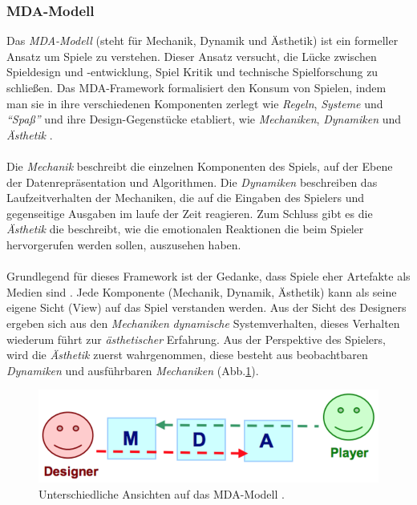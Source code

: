 \documentclass[a4paper,12pt]{scrartcl}
\begin{document}
\subsubsection{MDA-Modell}
Das \textit{MDA-Modell} (steht für Mechanik, Dynamik und Ästhetik) ist ein formeller Ansatz um Spiele zu verstehen. Dieser Ansatz versucht, die Lücke zwischen Spieldesign und -entwicklung, Spiel Kritik und technische Spielforschung zu schließen. Das MDA-Framework formalisiert den Konsum von Spielen, indem man sie in ihre verschiedenen Komponenten zerlegt wie \textit{Regeln}, \textit{Systeme} und \textit{\enquote{Spaß}} und ihre Design-Gegenstücke etabliert, wie \textit{Mechaniken}, \textit{Dynamiken} und \textit{Ästhetik} \cite{Hunicke2004}.
\\\\
Die \textit{Mechanik} beschreibt die einzelnen Komponenten des Spiels, auf der Ebene der Datenrepräsentation und Algorithmen. Die \textit{Dynamiken} beschreiben das Laufzeitverhalten der Mechaniken, die auf die Eingaben des Spielers und gegenseitige Ausgaben im laufe der Zeit reagieren. Zum Schluss gibt es die \textit{Ästhetik} die beschreibt, wie die emotionalen Reaktionen die beim Spieler hervorgerufen werden sollen, auszusehen haben.
\\\\
Grundlegend für dieses Framework ist der Gedanke, dass Spiele eher Artefakte als Medien sind \cite{Hunicke2004}. Jede Komponente (Mechanik, Dynamik, Ästhetik) kann als seine eigene Sicht (View) auf das Spiel verstanden werden. Aus der Sicht des Designers ergeben sich aus den \textit{Mechaniken} \textit{dynamische} Systemverhalten, dieses Verhalten wiederum führt zur \textit{ästhetischer} Erfahrung. Aus der Perspektive des Spielers, wird die \textit{Ästhetik} zuerst wahrgenommen, diese besteht aus beobachtbaren \textit{Dynamiken} und ausführbaren \textit{Mechaniken} (Abb.\ref{MDAModelBild}). 
\begin{figure}[h!]
\begin{center}
\includegraphics[scale = 1.0]{Bilder/MDAModel.eps}
\caption{Unterschiedliche Ansichten auf das MDA-Modell \cite{Hunicke2004}.}
\label{MDAModelBild}
\end{center}
\end{figure}
\end{document}
